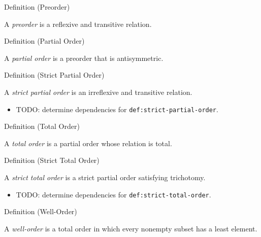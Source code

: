 \begin{definitionbox}{Definition (Preorder)}
\begin{definition*}[Preorder]
A \emph{preorder} is a reflexive and transitive relation.
\end{definition*}
\end{definitionbox}

\begin{definitionbox}{Definition (Partial Order)}
\begin{definition*}
A \emph{partial order} is a preorder that is antisymmetric.
\end{definition*}
\end{definitionbox}

\begin{definitionbox}{Definition (Strict Partial Order)}
\begin{definition}
\label{def:strict-partial-order}
A \emph{strict partial order} is an irreflexive and transitive relation.
\end{definition}
\end{definitionbox}

\begin{dependencies}
\begin{itemize}
  \item TODO: determine dependencies for \texttt{def:strict-partial-order}.
\end{itemize}
\end{dependencies}

\begin{definitionbox}{Definition (Total Order)}
\begin{definition*}
A \emph{total order} is a partial order whose relation is total.
\end{definition*}
\end{definitionbox}

\begin{definitionbox}{Definition (Strict Total Order)}
\begin{definition}
\label{def:strict-total-order}
A \emph{strict total order} is a strict partial order satisfying trichotomy.
\end{definition}
\end{definitionbox}

\begin{dependencies}
\begin{itemize}
  \item TODO: determine dependencies for \texttt{def:strict-total-order}.
\end{itemize}
\end{dependencies}

\begin{definitionbox}{Definition (Well-Order)}
\begin{definition*}
A \emph{well-order} is a total order in which every nonempty subset has a
least element.
\end{definition*}
\end{definitionbox}
